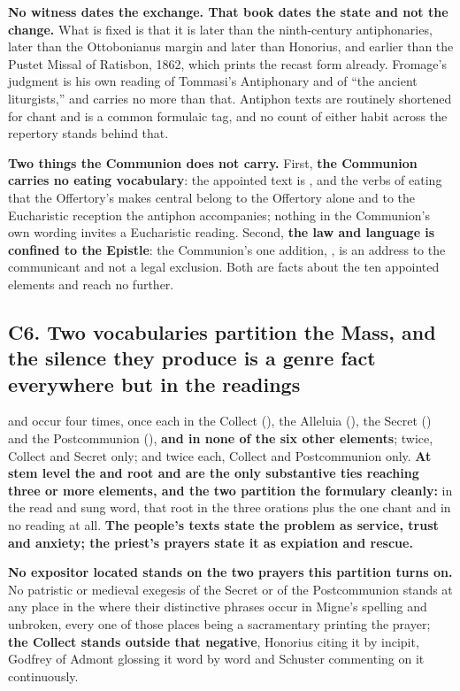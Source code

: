 \textbf{No witness dates the exchange. That book dates the state and not the
change.} What is fixed is that it is
later than the ninth-century antiphonaries, later than the Ottobonianus margin
and later than Honorius, and earlier than the Pustet Missal of Ratisbon, 1862,
which prints the recast form already.
Fromage's judgment is his own reading of Tommasi's Antiphonary and of ``the
ancient liturgists,'' and carries no more than that. Antiphon texts are
routinely shortened for chant and  is a common formulaic
tag, and no count of either habit across the repertory stands behind that.

\textbf{Two things the Communion does not carry.}
First, \textbf{the Communion carries no eating vocabulary}: the appointed text
is , and the verbs of eating that the
Offertory's  makes central belong to the Offertory alone and to
the Eucharistic reception the antiphon accompanies; nothing in the
Communion's own wording invites a Eucharistic reading. Second, \textbf{the law
and  language is confined to
the Epistle}: the Communion's one addition, , is an address
to the communicant and not a legal exclusion. Both are facts about the ten
appointed elements and reach no further.

\subsection*{C6. Two vocabularies partition the Mass, and the silence they produce is a genre fact everywhere but in the readings}

 and  occur four times, once each in the Collect
(), the Alleluia (), the Secret
() and the Postcommunion (), \textbf{and in
none of the six other elements};  twice, Collect and Secret
only;  and  twice each, Collect and Postcommunion
only. \textbf{At stem level the  and  root and
 are the only substantive ties reaching three or more elements,
and the two partition the formulary cleanly:}  in the read and
sung word, that root in the three orations plus the one chant and in no reading
at all. \textbf{The
people's texts state the problem as service, trust and anxiety; the priest's
prayers state it as expiation and rescue.}

\textbf{No expositor located stands on the two prayers this partition turns on.}
No patristic or medieval exegesis of the Secret  or
of the Postcommunion  stands at any place in
the  where their distinctive phrases occur in Migne's
spelling and unbroken, every one of those places being a sacramentary printing
the prayer; \textbf{the
Collect stands outside that negative}, Honorius citing it by incipit, Godfrey of
Admont glossing it word by word and Schuster commenting on it continuously.

